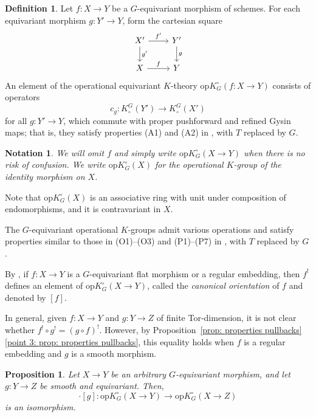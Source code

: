 \documentclass[12pt]{amsart}
\newcommand{\Kring}{K^{\circ}}
\newcommand{\Kgroup}{K_{\circ}}
\newcommand{\opK}{\mathrm{op}K^{\circ}}
\newtheorem{Prop}[theorem]{Proposition}
\newtheorem{notation}[theorem]{Notation}
\theoremstyle{definition}
\newtheorem{Def}[theorem]{Definition}
\begin{document}
\begin{Def}\label{def: operational K-theory}
    Let $f \colon X \to Y$ be a $G$-equivariant morphism of schemes. For each equivariant morphism $g \colon Y' \to Y$, form the cartesian square
\begin{equation}\label{eqn: cartesian diagram}
\begin{tikzcd}
X' \arrow[r, "f'"] \arrow[d, "g'"] & Y' \arrow[d, "g"] \\
X \arrow[r, "f"] & Y
\end{tikzcd}
\end{equation}
An element of the operational equivariant $K$-theory $\mathrm{op}\Kring_{G}(f:X \to Y)$ consists of operators
\[
c_g \colon \Kgroup^{G}(Y') \to \Kgroup^{G}(X')
\]
for all $g \colon Y' \to Y$, which commute with proper pushforward and refined Gysin maps; that is, they satisfy properties (A1) and (A2) in \cite[Definition 4.1]{AndersonPayne-OperationalKtheory}, with $T$ replaced by $G$. 
\end{Def}

\begin{notation}
    We will omit $f$ and simply write $\opK_{G}(X \to Y)$ when there is no risk of confusion. We write $\mathrm{op}\Kring_{G}(X)$ for the operational $K$-group of the identity morphism on $X$.
\end{notation}
Note that $\mathrm{op}\Kring_{G}(X)$ is an associative ring with unit under composition of endomorphisms, and it is contravariant in $X$.

The $G$-equivariant operational $K$-groups admit various operations and satisfy properties similar to those in (O1)--(O3) and (P1)--(P7) in \cite[Sections 4.1. and 4.2]{AndersonPayne-OperationalKtheory}, with $T$ replaced by $G$.

By , if $f \colon X \to Y$ is a $G$-equivariant flat morphism or a regular embedding, then $f^!$ defines an element of $\opK_{G}(X \to Y)$, called the \emph{canonical orientation} of $f$ and denoted by $[f]$. 

In general, given $f:X \to Y$ and $g: Y \to Z$ of finite Tor-dimension, it is not clear whether $f^! \circ g^! = (g \circ f)^!$. However, by Proposition~\ref{prop: properties pullbacks}\eqref{point 3: prop: properties pullbacks}, this equality holds when $f$ is a regular embedding and $g$ is a smooth morphism.

\begin{Prop}\label{prop: composition with smooth is iso in Ktheory}
Let $X \to Y$ be an arbitrary $G$-equivariant morphism, and let $g \colon Y \to Z$ be smooth and equivariant. Then,
\[
\cdot [g] \colon \opK_{G}(X \to Y) \to \opK_{G}(X \to Z)
\]
is an isomorphism.
\end{Prop}
\end{document}
